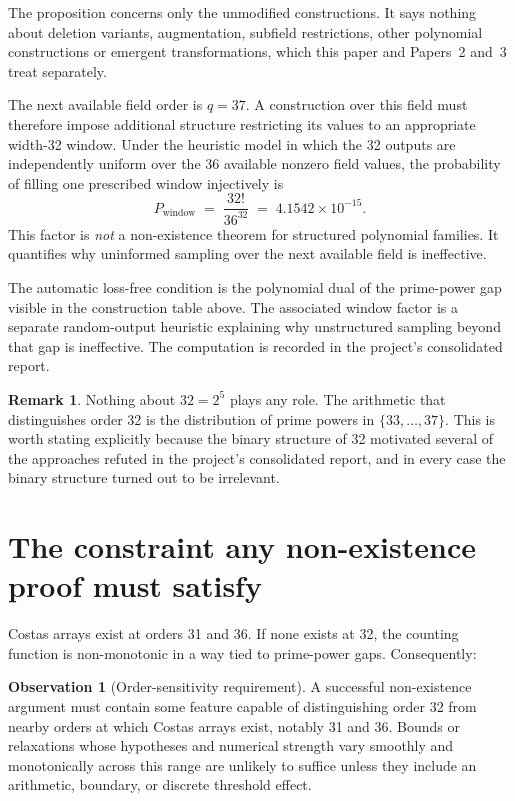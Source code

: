 \documentclass[11pt,a4paper,oneside]{report}
\theoremstyle{definition}
\newtheorem{remark}[theorem]{Remark}
\newtheorem{observation}[theorem]{Observation}
\begin{document}
\noindent The proposition concerns only the unmodified constructions. It says nothing about deletion
variants, augmentation, subfield restrictions, other polynomial constructions or emergent
transformations, which this paper and Papers~2 and~3 treat separately.

The next available field order is $q=37$. A construction over this field must
therefore impose additional structure restricting its values to an appropriate
width-32 window. Under the heuristic model in which the 32 outputs are
independently uniform over the 36 available nonzero field values, the probability
of filling one prescribed window injectively is
\[
P_{\mathrm{window}} \;=\; \frac{32!}{36^{32}} \;=\; 4.1542\times10^{-15}.
\]
This factor is \emph{not} a non-existence theorem for structured polynomial
families. It quantifies why uninformed sampling over the next available field is
ineffective.

The automatic loss-free condition is the polynomial dual of the prime-power gap
visible in the construction table above. The associated window factor is a
separate random-output heuristic explaining why unstructured sampling beyond that
gap is ineffective. The computation is recorded in the project's consolidated report.

\begin{remark}
Nothing about $32 = 2^5$ plays any role. The arithmetic that distinguishes order
32 is the distribution of prime powers in $\{33,\dots,37\}$. This is worth
stating explicitly because the binary structure of 32 motivated several of the
approaches refuted in the project's consolidated report, and in every case the
binary structure turned out to be irrelevant.
\end{remark}

\section{The constraint any non-existence proof must satisfy}

Costas arrays exist at orders 31 and 36. If none exists at 32, the counting
function is non-monotonic in a way tied to prime-power gaps. Consequently:

\begin{observation}[Order-sensitivity requirement]
\label{p1-obs:uniformity}
A successful non-existence argument must contain some feature capable of
distinguishing order 32 from nearby orders at which Costas arrays exist, notably
31 and 36. Bounds or relaxations whose hypotheses and numerical strength vary
smoothly and monotonically across this range are unlikely to suffice unless they
include an arithmetic, boundary, or discrete threshold effect.
\end{observation}
\end{document}

